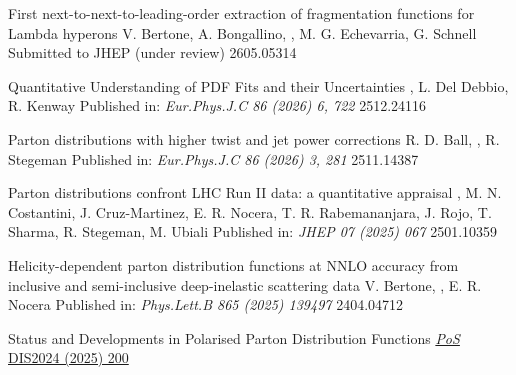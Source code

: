 
  {First next-to-next-to-leading-order extraction of fragmentation functions
   for Lambda hyperons}
  {V. Bertone, A. Bongallino, \me, M. G. Echevarria, G. Schnell}
  {Submitted to JHEP (under review)}
  {2605.05314}

  {Quantitative Understanding of PDF Fits and their Uncertainties}
  {\me, L. Del Debbio, R. Kenway}
  {Published in: \textit{Eur.Phys.J.C 86 (2026) 6, 722}}
  {2512.24116}

  {Parton distributions with higher twist and jet power corrections}
  {R. D. Ball, \me, R. Stegeman}
  {Published in: \textit{Eur.Phys.J.C 86 (2026) 3, 281}}
  {2511.14387}

  {Parton distributions confront LHC Run II data: a quantitative appraisal}
  {\me, M. N. Costantini, J. Cruz-Martinez, E. R. Nocera, T. R. Rabemananjara,
   J. Rojo, T. Sharma, R. Stegeman, M. Ubiali}
  {Published in: \textit{JHEP 07 (2025) 067}}
  {2501.10359}

  {Helicity-dependent parton distribution functions at NNLO accuracy from
   inclusive and semi-inclusive deep-inelastic scattering data} {V. Bertone,
   \me, E. R. Nocera} {Published in: \textit{Phys.Lett.B 865 (2025) 139497}}
   {2404.04712}

  {Status and Developments in Polarised Parton Distribution Functions}
  {\me}
  {\href{https://pos.sissa.it/469/200/pdf}{\textit{PoS} DIS2024 (2025) 200}}
  {}

